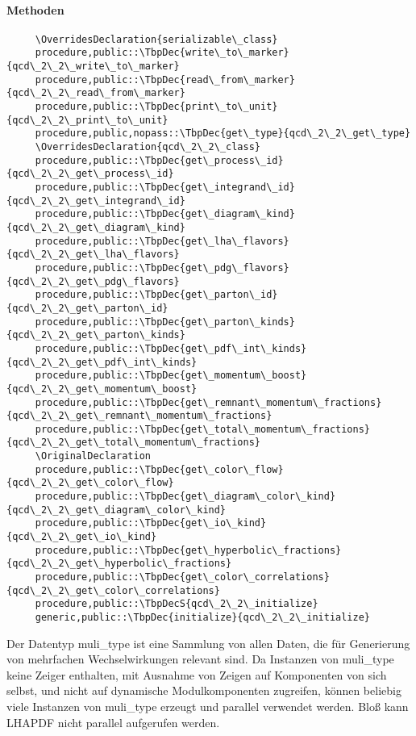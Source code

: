 \paragraph{Methoden}
\begin{Verbatim}
     \OverridesDeclaration{serializable\_class}
     procedure,public::\TbpDec{write\_to\_marker}{qcd\_2\_2\_write\_to\_marker}
     procedure,public::\TbpDec{read\_from\_marker}{qcd\_2\_2\_read\_from\_marker}
     procedure,public::\TbpDec{print\_to\_unit}{qcd\_2\_2\_print\_to\_unit}
     procedure,public,nopass::\TbpDec{get\_type}{qcd\_2\_2\_get\_type}
     \OverridesDeclaration{qcd\_2\_2\_class}
     procedure,public::\TbpDec{get\_process\_id}{qcd\_2\_2\_get\_process\_id}
     procedure,public::\TbpDec{get\_integrand\_id}{qcd\_2\_2\_get\_integrand\_id}
     procedure,public::\TbpDec{get\_diagram\_kind}{qcd\_2\_2\_get\_diagram\_kind}
     procedure,public::\TbpDec{get\_lha\_flavors}{qcd\_2\_2\_get\_lha\_flavors}
     procedure,public::\TbpDec{get\_pdg\_flavors}{qcd\_2\_2\_get\_pdg\_flavors}
     procedure,public::\TbpDec{get\_parton\_id}{qcd\_2\_2\_get\_parton\_id}
     procedure,public::\TbpDec{get\_parton\_kinds}{qcd\_2\_2\_get\_parton\_kinds}
     procedure,public::\TbpDec{get\_pdf\_int\_kinds}{qcd\_2\_2\_get\_pdf\_int\_kinds}
     procedure,public::\TbpDec{get\_momentum\_boost}{qcd\_2\_2\_get\_momentum\_boost}
     procedure,public::\TbpDec{get\_remnant\_momentum\_fractions}{qcd\_2\_2\_get\_remnant\_momentum\_fractions}
     procedure,public::\TbpDec{get\_total\_momentum\_fractions}{qcd\_2\_2\_get\_total\_momentum\_fractions}
     \OriginalDeclaration
     procedure,public::\TbpDec{get\_color\_flow}{qcd\_2\_2\_get\_color\_flow}
     procedure,public::\TbpDec{get\_diagram\_color\_kind}{qcd\_2\_2\_get\_diagram\_color\_kind}
     procedure,public::\TbpDec{get\_io\_kind}{qcd\_2\_2\_get\_io\_kind}
     procedure,public::\TbpDec{get\_hyperbolic\_fractions}{qcd\_2\_2\_get\_hyperbolic\_fractions}
     procedure,public::\TbpDec{get\_color\_correlations}{qcd\_2\_2\_get\_color\_correlations}
     procedure,public::\TbpDecS{qcd\_2\_2\_initialize}
     generic,public::\TbpDec{initialize}{qcd\_2\_2\_initialize}
\end{Verbatim}
Der Datentyp muli\_type ist eine Sammlung von allen Daten, die für Generierung von mehrfachen Wechselwirkungen relevant sind. Da Instanzen von muli\_type keine Zeiger enthalten, mit Ausnahme von Zeigen auf Komponenten von sich selbst, und nicht auf dynamische Modulkomponenten zugreifen, können beliebig viele Instanzen von muli\_type erzeugt und parallel verwendet werden. Bloß kann LHAPDF nicht parallel aufgerufen werden.

